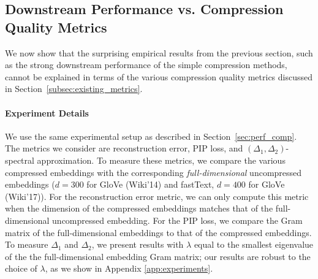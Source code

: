 



\subsection{Downstream Performance vs. Compression Quality Metrics}
\label{subsec:hard_explain}
We now show that the surprising empirical results from the previous section, such as the strong downstream performance of the simple compression methods, cannot be explained in terms of the various compression quality metrics discussed in Section~\ref{subsec:existing_metrics}.

\paragraph{Experiment Details}
We use the same experimental setup as described in Section~\ref{sec:perf_comp}.
The metrics we consider are reconstruction error, PIP loss, and $(\Delta_1,\Delta_2)$-spectral approximation.
To measure these metrics, we compare the various compressed embeddings with the corresponding \textit{full-dimensional} uncompressed embeddings ($d=300$ for GloVe (Wiki'14) and fastText, $d=400$ for GloVe (Wiki'17)).
For the reconstruction error metric, we can only compute this metric when the dimension of the compressed embeddings matches that of the full-dimensional uncompressed embedding.
For the PIP loss, we compare the Gram matrix of the full-dimensional embeddings to that of the compressed embeddings.
To measure $\Delta_1$ and $\Delta_2$, we present results with $\lambda$ equal to the smallest eigenvalue of the the full-dimensional embedding Gram matrix; our results are robust to the choice of $\lambda$, as we show in Appendix \ref{app:experiments}.

